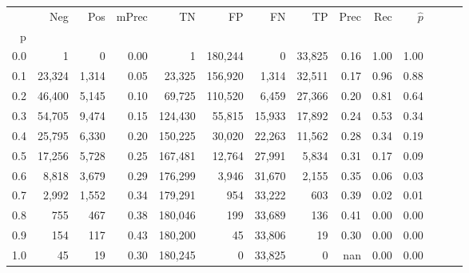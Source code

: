 \begin{tabular}{rrrrrrrrrrrrrr}
\toprule
{} &     Neg &    Pos & mPrec &       TN &       FP &      FN &      TP &  Prec &   Rec & $\hat{p}$ \\
p   &         &        &       &          &          &         &         &       &       &           \\
\midrule
0.0 &       1 &      0 &  0.00 &        1 &  180,244 &       0 &  33,825 &  0.16 &  1.00 &      1.00 \\
0.1 &  23,324 &  1,314 &  0.05 &   23,325 &  156,920 &   1,314 &  32,511 &  0.17 &  0.96 &      0.88 \\
0.2 &  46,400 &  5,145 &  0.10 &   69,725 &  110,520 &   6,459 &  27,366 &  0.20 &  0.81 &      0.64 \\
0.3 &  54,705 &  9,474 &  0.15 &  124,430 &   55,815 &  15,933 &  17,892 &  0.24 &  0.53 &      0.34 \\
0.4 &  25,795 &  6,330 &  0.20 &  150,225 &   30,020 &  22,263 &  11,562 &  0.28 &  0.34 &      0.19 \\
0.5 &  17,256 &  5,728 &  0.25 &  167,481 &   12,764 &  27,991 &   5,834 &  0.31 &  0.17 &      0.09 \\
0.6 &   8,818 &  3,679 &  0.29 &  176,299 &    3,946 &  31,670 &   2,155 &  0.35 &  0.06 &      0.03 \\
0.7 &   2,992 &  1,552 &  0.34 &  179,291 &      954 &  33,222 &     603 &  0.39 &  0.02 &      0.01 \\
0.8 &     755 &    467 &  0.38 &  180,046 &      199 &  33,689 &     136 &  0.41 &  0.00 &      0.00 \\
0.9 &     154 &    117 &  0.43 &  180,200 &       45 &  33,806 &      19 &  0.30 &  0.00 &      0.00 \\
1.0 &      45 &     19 &  0.30 &  180,245 &        0 &  33,825 &       0 &   nan &  0.00 &      0.00 \\
\bottomrule
\end{tabular}
